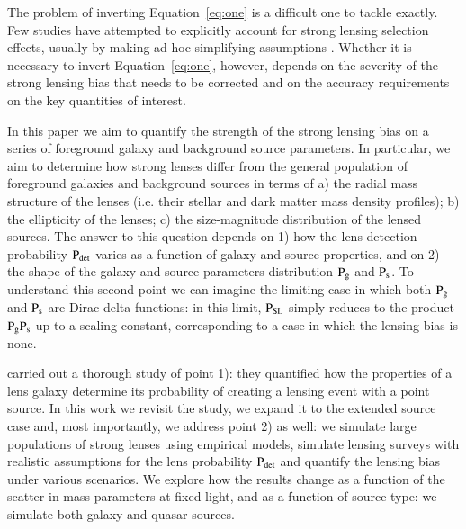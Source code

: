 \documentclass{aa}
\def\prlens{{\rm P}_\mathrm{g}}
\def\prsource{{\rm P}_\mathrm{s}}
\def\prsl{{\rm P}_\mathrm{{SL}}}
\def\pdet{{\rm P}_\mathrm{det}}
\def\Eref#1{Equation~\ref{#1}\xspace}
\begin{document}
The problem of inverting \Eref{eq:one} is a difficult one to tackle exactly.
Few studies have attempted to explicitly account for strong lensing selection effects, usually by making ad-hoc simplifying assumptions \citep{Son++15,O+A17,Son++19}.
Whether it is necessary to invert \Eref{eq:one}, however, depends on the severity of the strong lensing bias that needs to be corrected and on the accuracy requirements on the key quantities of interest.

In this paper we aim to quantify the strength of the strong lensing bias on a series of foreground galaxy and background source parameters. %
In particular, we aim to determine how strong lenses differ from the general population of foreground galaxies and background sources in terms of a) the radial mass structure of the lenses (i.e. their stellar and dark matter mass density profiles); b) the ellipticity of the lenses; c) the size-magnitude distribution of the lensed sources.
The answer to this question depends on 1) how the lens detection probability $\pdet$ varies as a function of galaxy and source properties, and on 2) the shape of the galaxy and source parameters distribution $\prlens$ and $\prsource$. To understand this second point we can imagine the limiting case in which both $\prlens$ and $\prsource$ are Dirac delta functions: in this limit, $\prsl$ simply reduces to the product $\prlens\prsource$ up to a scaling constant, corresponding to a case in which the lensing bias is none.

\citet{MVK09} carried out a thorough study of point 1): they quantified how the properties of a lens galaxy determine its probability of creating a lensing event with a point source.
In this work we revisit the \citet{MVK09} study, we expand it to the extended source case and, most importantly, we address point 2) as well: we simulate large populations of strong lenses using empirical models, simulate lensing surveys with realistic assumptions for the lens probability $\pdet$ and quantify the lensing bias under various scenarios.
We explore how the results change as a function of the scatter in mass parameters at fixed light, and as a function of source type: we simulate both galaxy and quasar sources.
\end{document}
